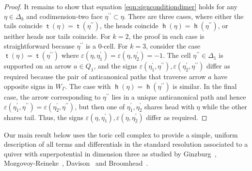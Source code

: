 \documentclass[11pt,a4paper]{amsart}
\numberwithin{equation}{section}
\theoremstyle{definition}
\theoremstyle{remark}
\newcommand{\head}{\operatorname{\mathsf{h}}}
\newcommand{\tail}{\operatorname{\mathsf{t}}}
\begin{document}
\begin{proof}
It remains to show that equation \eqref{eqn:signconditiondimer} holds for any $\eta\in \Delta_k$ and codimension-two face $\eta^{\prime\prime}\subset \eta$. There are three cases, where either the tails coincide $\tail(\eta)=\tail(\eta^{\prime\prime})$, the heads coincide $\head(\eta)=\head(\eta^{\prime\prime})$, or neither heads nor tails coincide. For $k=2$, the proof in each case is straightforward because $\eta^{\prime\prime}$ is a 0-cell. For $k=3$, consider the case $\tail(\eta)=\tail(\eta^{\prime\prime})$ where $\varepsilon(\eta,\eta_1^\prime)=\varepsilon(\eta,\eta^\prime_2)=-1$. The cell $\eta^{\prime\prime}\in \Delta_1$ is supported on an arrow $a\in Q_1$, and the signs $\varepsilon(\eta^\prime_1,\eta^{\prime\prime}), \varepsilon(\eta^\prime_2,\eta^{\prime\prime})$ differ as required because the pair of anticanonical paths that traverse arrow $a$ have opposite signs in $W_\Gamma$. The case with $\head(\eta)=\head(\eta^{\prime\prime})$ is similar. In the final case, the arrow corresponding to $\eta^{\prime\prime}$ lies in a unique anticanonical path and hence $\varepsilon(\eta_1^\prime,\eta^{\prime\prime}) = \varepsilon(\eta_2^\prime,\eta^{\prime\prime})$, but then one of $\eta_1^\prime, \eta_2^\prime$ shares head with $\eta$ while the other shares tail. Thus, the signs $\varepsilon(\eta, \eta_1^{\prime}), \varepsilon(\eta,\eta_2^{\prime})$ differ as required.
\end{proof}

Our main result below uses the toric cell complex to provide a simple, uniform description of all terms and differentials in the standard resolution associated to a quiver with superpotential in dimension three as studied by Ginzburg~\cite{Ginzburg}, Mozgovoy-Reineke~\cite{MozgovoyReineke}, Davison~\cite{Davison} and Broomhead~\cite{Broomhead}.
\end{document}
